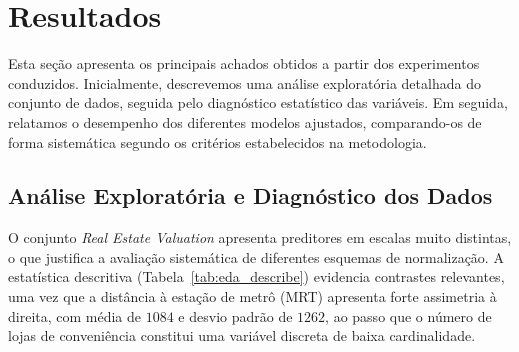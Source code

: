\section{Resultados}
\label{chap:resultados}

Esta seção apresenta os principais achados obtidos a partir dos experimentos conduzidos. Inicialmente, descrevemos uma análise exploratória detalhada do conjunto de dados, seguida pelo diagnóstico estatístico das variáveis. Em seguida, relatamos o desempenho dos diferentes modelos ajustados, comparando-os de forma sistemática segundo os critérios estabelecidos na metodologia.

\subsection{Análise Exploratória e Diagnóstico dos Dados}


O conjunto \textit{Real Estate Valuation} apresenta preditores em escalas muito distintas, o que justifica a avaliação sistemática de diferentes esquemas de normalização. A estatística descritiva (Tabela~\ref{tab:eda_describe}) evidencia contrastes relevantes, uma vez que a distância à estação de metrô (MRT) apresenta forte assimetria à direita, com média de $1084$ e desvio padrão de $1262$, ao passo que o número de lojas de conveniência constitui uma variável discreta de baixa cardinalidade.


